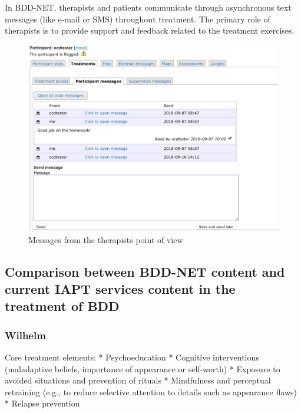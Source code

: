 \documentclass[]{book}
\theoremstyle{definition}
\theoremstyle{definition}
\theoremstyle{definition}
\theoremstyle{remark}
\begin{document}
In BDD-NET, therapists and patients communicate through asynchronous
text messages (like e-mail or SMS) throughout treatment. The primary
role of therapists is to provide support and feedback related to the
treatment exercises.

\begin{figure}
\centering
\includegraphics[width=5.20833in,height=\textheight]{images/therapist-messages.png}
\caption{Messages from the therapists point of view}
\end{figure}

\hypertarget{comparison-between-bdd-net-content-and-current-iapt-services-content-in-the-treatment-of-bdd}{%
\subsection{Comparison between BDD-NET content and current IAPT services
content in the treatment of
BDD}\label{comparison-between-bdd-net-content-and-current-iapt-services-content-in-the-treatment-of-bdd}}

\hypertarget{wilhelm-wilhelm2013}{%
\subsubsection{\texorpdfstring{Wilhelm
\citep{wilhelm2013}}{Wilhelm {[}@wilhelm2013{]}}}\label{wilhelm-wilhelm2013}}

Core treatment elements: * Psychoeducation * Cognitive interventions
(maladaptive beliefs, importance of appearance or self-worth) * Exposure
to avoided situations and prevention of rituals * Mindfulness and
perceptual retraining (e.g., to reduce selective attention to details
such as appearance flaws) * Relapse prevention
\end{document}
